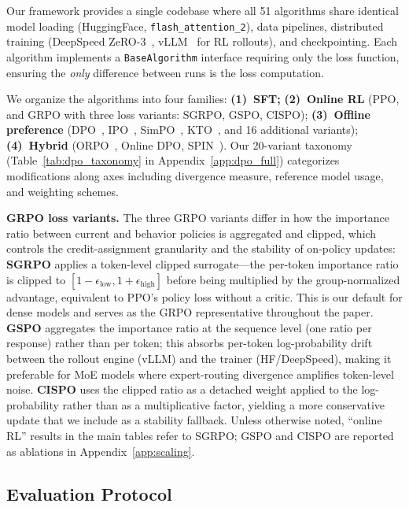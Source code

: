 \documentclass{article}
\begin{document}
Our framework provides a single codebase where all 51 algorithms share identical model loading (HuggingFace, \texttt{flash\_attention\_2}), data pipelines, distributed training (DeepSpeed ZeRO-3~\citep{rajbhandari2020zero}, vLLM~\citep{kwon2023efficient} for RL rollouts), and checkpointing.
Each algorithm implements a \texttt{BaseAlgorithm} interface requiring only the loss function, ensuring the \emph{only} difference between runs is the loss computation.

We organize the algorithms into four families:
\textbf{(1)~SFT;} \textbf{(2)~Online RL} (PPO, and GRPO with three loss variants: SGRPO, GSPO, CISPO);
\textbf{(3)~Offline preference} (DPO~\citep{rafailov2023direct}, IPO~\citep{azar2024general}, SimPO~\citep{meng2024simpo}, KTO~\citep{ethayarajh2024kto}, and 16 additional variants);
\textbf{(4)~Hybrid} (ORPO~\citep{hong2024orpo}, Online DPO, SPIN~\citep{chen2024spin}).
Our 20-variant taxonomy (Table~\ref{tab:dpo_taxonomy} in Appendix~\ref{app:dpo_full}) categorizes modifications along axes including divergence measure, reference model usage, and weighting schemes.

\textbf{GRPO loss variants.} The three GRPO variants differ in how the importance ratio between current and behavior policies is aggregated and clipped, which controls the credit-assignment granularity and the stability of on-policy updates:
\textbf{SGRPO} applies a token-level clipped surrogate---the per-token importance ratio is clipped to $[1{-}\epsilon_{\text{low}}, 1{+}\epsilon_{\text{high}}]$ before being multiplied by the group-normalized advantage, equivalent to PPO's policy loss without a critic. This is our default for dense models and serves as the GRPO representative throughout the paper. \textbf{GSPO} aggregates the importance ratio at the sequence level (one ratio per response) rather than per token; this absorbs per-token log-probability drift between the rollout engine (vLLM) and the trainer (HF/DeepSpeed), making it preferable for MoE models where expert-routing divergence amplifies token-level noise. \textbf{CISPO} uses the clipped ratio as a detached weight applied to the log-probability rather than as a multiplicative factor, yielding a more conservative update that we include as a stability fallback. Unless otherwise noted, ``online RL'' results in the main tables refer to SGRPO; GSPO and CISPO are reported as ablations in Appendix~\ref{app:scaling}.

\subsection{Evaluation Protocol}
\label{sec:eval_protocol}
\end{document}
